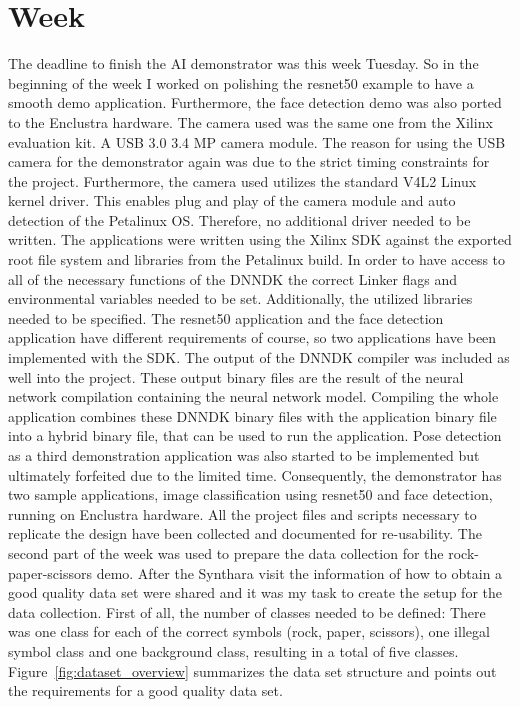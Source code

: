 \chapter{Week}
The deadline to finish the \ac{AI} demonstrator was this week Tuesday. So in the beginning of the week I worked on polishing the resnet50 example to have a smooth demo application. Furthermore, the face detection demo was also ported to the Enclustra hardware. The camera used was the same one from the Xilinx evaluation kit. A \ac{USB} 3.0 3.4 MP camera module. The reason for using the \ac{USB} camera for the demonstrator again was due to the strict timing constraints for the project. Furthermore, the camera used utilizes the standard V4L2 Linux kernel driver. This enables plug and play of the camera module and auto detection of the Petalinux \ac{OS}. Therefore, no additional driver needed to be written. The applications were written using the Xilinx \ac{SDK} against the exported root file system and libraries from the Petalinux build. In order to have access to all of the necessary functions of the \ac{DNNDK} the correct Linker flags and environmental variables needed to be set. Additionally, the utilized libraries needed to be specified. The resnet50 application and the face detection application have different requirements of course, so two applications have been implemented with the \ac{SDK}. The output of the \ac{DNNDK} compiler was included as well into the project. These output binary files are the result of the neural network compilation containing the neural network model. Compiling the whole application combines these \ac{DNNDK} binary files with the application binary file into a hybrid binary file, that can be used to run the application. Pose detection as a third demonstration application was also started to be implemented but ultimately forfeited due to the limited time. Consequently, the demonstrator has two sample applications, image classification using resnet50 and face detection, running on Enclustra hardware. All the project files and scripts necessary to replicate the design have been collected and documented for re-usability.
The second part of the week was used to prepare the data collection for the rock-paper-scissors demo. After the Synthara visit the information of how to obtain a good quality data set were shared and it was my task to create the setup for the data collection. First of all, the number of classes needed to be defined: There was one class for each of the correct symbols (rock, paper, scissors), one illegal symbol class and one background class, resulting in a total of five classes. Figure~\ref{fig:dataset_overview} summarizes the data set structure and points out the requirements for a good quality data set.
